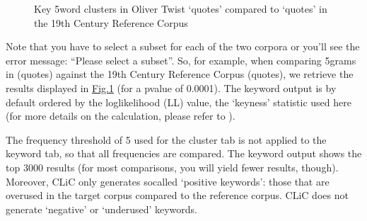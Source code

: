 \documentclass[letterpaper,10pt,english]{sphinxmanual}
\begin{document}
\begin{figure}[htbp]
\centering
\capstart

\noindent{}
\caption{Key 5\sphinxhyphen{}word clusters in Oliver Twist ‘quotes’ compared to
‘quotes’ in the 19th Century Reference Corpus}\label{\detokenize{clicanalysis/keywords:id5}}\label{\detokenize{clicanalysis/keywords:figure-analysis-keywords-19thcentury}}\end{figure}

\sphinxAtStartPar
Note that you have to select a subset for each of the two corpora or
you’ll see the error message: “Please select a subset”. So, for example,
when comparing 5\sphinxhyphen{}grams in  (quotes) against the 19th
Century Reference Corpus (quotes), we retrieve the results displayed in
\hyperref[\detokenize{clicanalysis/keywords:figure-analysis-keywords-19thcentury}]{Fig.\@ \ref{\detokenize{clicanalysis/keywords:figure-analysis-keywords-19thcentury}}} (for a p\sphinxhyphen{}value of
0.0001). The keyword output is by default ordered by the log\sphinxhyphen{}likelihood
(LL) value, the ‘keyness’ statistic used here (for more details on the
calculation, please refer to ).

\sphinxAtStartPar
The frequency threshold of 5 used for the cluster tab is not applied to
the keyword tab, so that all frequencies are compared. The keyword
output shows the top 3000 results (for most comparisons, you will yield
fewer results, though). Moreover, CLiC only generates so\sphinxhyphen{}called
‘positive keywords’: those that are overused in the target corpus
compared to the reference corpus. CLiC does not generate ‘negative’ or
‘underused’ keywords.

\sphinxstepscope
\end{document}
